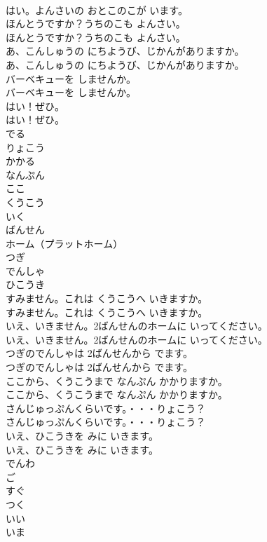 \documentclass[8pt]{extreport}
\begin{document}
\begin{CJK}{UTF8}{min}
\\	はい。よんさいの おとこのこが います。
\\	ほんとうですか？うちのこも よんさい。
\\	ほんとうですか？うちのこも よんさい。
\\	あ、こんしゅうの にちようび、じかんがありますか。
\\	あ、こんしゅうの にちようび、じかんがありますか。
\\	バーベキューを しませんか。
\\	バーベキューを しませんか。
\\	はい！ぜひ。
\\	はい！ぜひ。
\\	でる
\\	りょこう
\\	かかる
\\	なんぷん
\\	ここ
\\	くうこう
\\	いく
\\	ばんせん
\\	ホーム（プラットホーム）
\\	つぎ
\\	でんしゃ
\\	ひこうき
\\	すみません。これは くうこうへ いきますか。
\\	すみません。これは くうこうへ いきますか。
\\	いえ、いきません。2ばんせんのホームに いってください。
\\	いえ、いきません。2ばんせんのホームに いってください。
\\	つぎのでんしゃは 2ばんせんから でます。
\\	つぎのでんしゃは 2ばんせんから でます。
\\	ここから、くうこうまで なんぷん かかりますか。
\\	ここから、くうこうまで なんぷん かかりますか。
\\	さんじゅっぷんくらいです。・・・りょこう？
\\	さんじゅっぷんくらいです。・・・りょこう？
\\	いえ、ひこうきを みに いきます。
\\	いえ、ひこうきを みに いきます。
\\	でんわ
\\	ご
\\	すぐ
\\	つく
\\	いい
\\	いま

\end{CJK}
\end{document}
